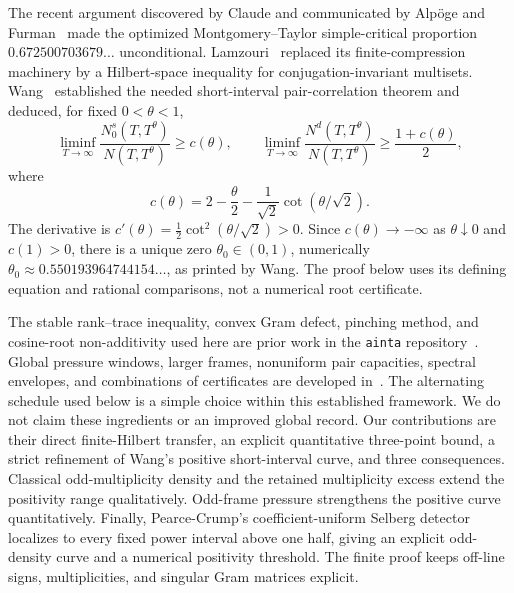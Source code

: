 \documentclass[11pt]{article}
\theoremstyle{remark}
\begin{document}
The recent argument discovered by Claude and communicated by Alp\"oge and %
Furman~\cite{AF} made the optimized Montgomery--Taylor simple-critical
proportion $0.672500703679\ldots$ unconditional. Lamzouri~\cite{Lamzouri}
replaced its finite-compression machinery by a Hilbert-space inequality for
conjugation-invariant multisets. Wang~\cite{Wang} established the needed
short-interval pair-correlation theorem and deduced, for fixed $0<\theta<1$,
\begin{equation}\label{eq:wang}
 \liminf_{T\to\infty}\frac{N_0^s(T,T^\theta)}{N(T,T^\theta)}\ge c(\theta),
 \qquad
 \liminf_{T\to\infty}\frac{N^d(T,T^\theta)}{N(T,T^\theta)}
 \ge\frac{1+c(\theta)}2,
\end{equation}
where
\begin{equation}\label{eq:c}
 c(\theta)=2-\frac\theta2-\frac1{\sqrt2}\cot(\theta/\sqrt2).
\end{equation}
The derivative is $c'(\theta)=\tfrac12\cot^2(\theta/\sqrt2)>0$. Since
$c(\theta)\to-\infty$ as $\theta\downarrow0$ and $c(1)>0$, there is a
unique zero $\theta_0\in(0,1)$, numerically
$\theta_0\approx0.550193964744154\ldots$, as printed by Wang. The
proof below uses its defining equation and rational comparisons, not a
numerical root certificate.

The stable rank--trace inequality, convex Gram defect, pinching method, and
cosine-root non-additivity used here are prior work in the
\texttt{ainta} repository~\cite{Ainta}. Global pressure windows, larger
frames, nonuniform pair capacities, spectral envelopes, and combinations
of certificates are developed in~\cite{Trmdy,Tawan,Shi}. The alternating
schedule used below is a simple choice within this established framework.
We do not claim these ingredients or an improved global record. Our
contributions are their direct finite-Hilbert transfer, an explicit
quantitative three-point bound, a strict refinement of Wang's positive
short-interval curve, and three consequences. Classical odd-multiplicity
density and the retained multiplicity excess extend the positivity range
qualitatively. Odd-frame pressure strengthens the positive curve
quantitatively. Finally, Pearce-Crump's coefficient-uniform Selberg detector
localizes to every fixed power interval above one half, giving an explicit
odd-density curve and a numerical positivity threshold. The finite proof
keeps off-line signs, multiplicities, and singular Gram matrices explicit.
\end{document}
